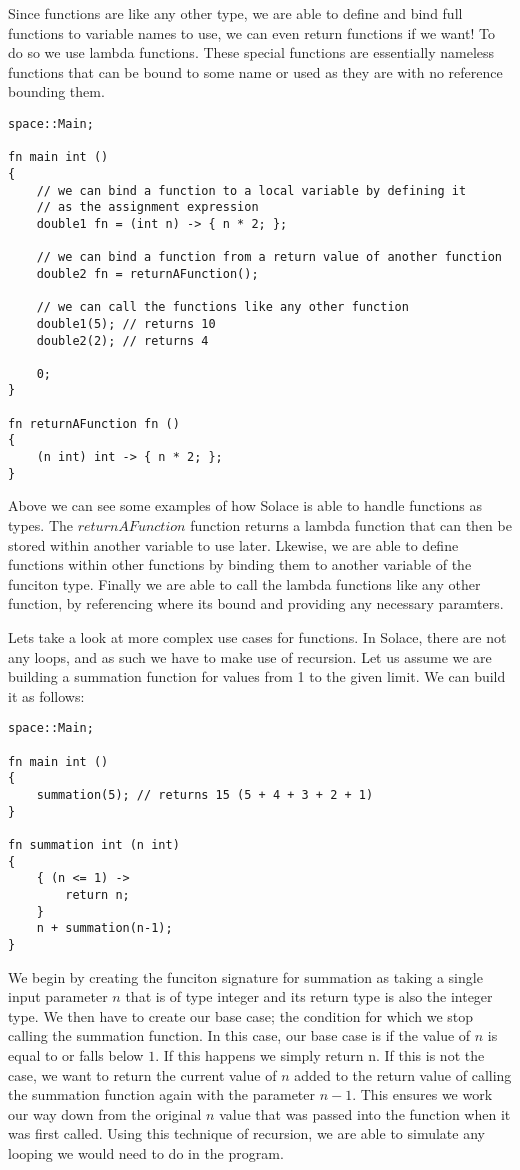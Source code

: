 \documentclass{article}
\begin{document}
Since functions are like any other type, we are able to define and bind full functions to variable names to use, we can even return functions if we want!
To do so we use lambda functions. These special functions are essentially nameless functions that can be bound to some name or used as they are
with no reference bounding them.

\begin{lstlisting}
space::Main;

fn main int ()
{
	// we can bind a function to a local variable by defining it 
	// as the assignment expression
	double1 fn = (int n) -> { n * 2; };

	// we can bind a function from a return value of another function
	double2 fn = returnAFunction();

	// we can call the functions like any other function
	double1(5); // returns 10
	double2(2); // returns 4

	0;
}

fn returnAFunction fn ()
{
	(n int) int -> { n * 2; };
}
\end{lstlisting}

Above we can see some examples of how Solace is able to handle functions as types. The $returnAFunction$ function returns a lambda function
that can then be stored within another variable to use later. Lkewise, we are able to define functions within other functions by binding them
to another variable of the funciton type. Finally we are able to call the lambda functions like any other function, by referencing where its
bound and providing any necessary paramters.

Lets take a look at more complex use cases for functions. In Solace, there are not any loops, and as such we have to make use of recursion.
Let us assume we are building a summation function for values from 1 to the given limit. We can build it as follows:

\begin{lstlisting}
space::Main;

fn main int ()
{
	summation(5); // returns 15 (5 + 4 + 3 + 2 + 1)
}

fn summation int (n int)
{
	{ (n <= 1) ->
		return n;
	}
	n + summation(n-1);
} 
\end{lstlisting}

We begin by creating the funciton signature for summation as taking a single input parameter $n$ that is of type integer and its return type is also the integer type.
We then have to create our base case; the condition for which we stop calling the summation function. In this case, our base case is if the value of $n$ is equal to
or falls below $1$. If this happens we simply return n. If this is not the case, we want to return the current value of $n$ added to the return value of calling the
summation function again with the parameter $n-1$. This ensures we work our way down from the original $n$ value that was passed into the function when it was first
called. Using this technique of recursion, we are able to simulate any looping we would need to do in the program.
\end{document}
